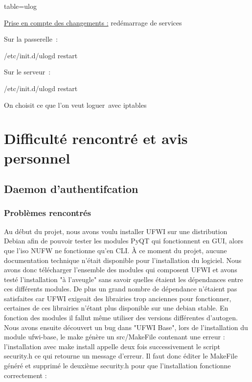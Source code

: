 \documentclass[12pt]{report}
\begin{document}
\begin{itemize}
table=ulog

\newline
\underline{Prise en compte des changements :} redémarrage de services

Sur la passerelle :

/etc/init.d/ulogd restart

\newline
Sur le serveur :

/etc/init.d/ulogd restart

\newline
On choisit ce que l’on veut loguer avec iptables

\chapter{Difficulté rencontré et avis personnel}
\section{Daemon d'authentifcation}
\subsection{Problèmes rencontrés}
Au début du projet, nous avons voulu installer UFWI sur une distribution Debian afin de pouvoir tester les modules PyQT qui fonctionnent en GUI,
alors que l'iso NUFW ne fonctionne qu'en CLI.
À ce moment du projet, aucune documentation technique n'était disponible pour l'installation du logiciel.
Nous avons donc télécharger l'ensemble des modules qui composent UFWI et avons testé l'installation "à l'aveugle" sans savoir quelles étaient les 
dépendances entre ces différents modules.
De plus un grand nombre de dépendance n'étaient pas satisfaites car UFWI exigeait des librairies trop anciennes pour fonctionner, 
certaines de ces librairies n'étant plus disponible sur une debian stable.
En fonction des modules il fallut même utiliser des versions différentes d'autogen.
Nous avons ensuite découvert un bug dans "UFWI Base", 
lors de l'installation du module ufwi-base, le make génère un src/MakeFile contenant une erreur : 
l'installation avec make install appelle deux fois successivement le script security.h ce qui retourne un message d'erreur. 
Il faut donc éditer le MakeFile généré et supprimé le deuxième security.h pour que l'installation fonctionne correctement :


\end{itemize}
\end{document}
